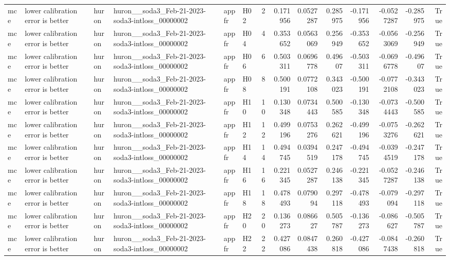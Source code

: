 \begin{longtable}{llllllrrrrrrrr}
mce & lower calibration error is better & huron & huron\_\_soda3\_Feb-21-2023-soda3-intloss\_00000002 & appfr & H02 & 2 & 0.171956 & 0.0527287 & 0.285975 & -0.171956 & -0.0527287 & -0.285975 & True \\
mce & lower calibration error is better & huron & huron\_\_soda3\_Feb-21-2023-soda3-intloss\_00000002 & appfr & H04 & 4 & 0.353652 & 0.0563069 & 0.256949 & -0.353652 & -0.0563069 & -0.256949 & True \\
mce & lower calibration error is better & huron & huron\_\_soda3\_Feb-21-2023-soda3-intloss\_00000002 & appfr & H06 & 6 & 0.503311 & 0.0696778 & 0.49607 & -0.503311 & -0.0696778 & -0.49607 & True \\
mce & lower calibration error is better & huron & huron\_\_soda3\_Feb-21-2023-soda3-intloss\_00000002 & appfr & H08 & 8 & 0.500191 & 0.0772108 & 0.343023 & -0.500191 & -0.0772108 & -0.343023 & True \\
mce & lower calibration error is better & huron & huron\_\_soda3\_Feb-21-2023-soda3-intloss\_00000002 & appfr & H10 & 10 & 0.130348 & 0.0734443 & 0.500585 & -0.130348 & -0.0734443 & -0.500585 & True \\
mce & lower calibration error is better & huron & huron\_\_soda3\_Feb-21-2023-soda3-intloss\_00000002 & appfr & H12 & 12 & 0.499196 & 0.0753276 & 0.262621 & -0.499196 & -0.0753276 & -0.262621 & True \\
mce & lower calibration error is better & huron & huron\_\_soda3\_Feb-21-2023-soda3-intloss\_00000002 & appfr & H14 & 14 & 0.494745 & 0.0394519 & 0.247178 & -0.494745 & -0.0394519 & -0.247178 & True \\
mce & lower calibration error is better & huron & huron\_\_soda3\_Feb-21-2023-soda3-intloss\_00000002 & appfr & H16 & 16 & 0.221345 & 0.0527287 & 0.246138 & -0.221345 & -0.0527287 & -0.246138 & True \\
mce & lower calibration error is better & huron & huron\_\_soda3\_Feb-21-2023-soda3-intloss\_00000002 & appfr & H18 & 18 & 0.478493 & 0.079094 & 0.297118 & -0.478493 & -0.079094 & -0.297118 & True \\
mce & lower calibration error is better & huron & huron\_\_soda3\_Feb-21-2023-soda3-intloss\_00000002 & appfr & H20 & 20 & 0.136273 & 0.086627 & 0.505787 & -0.136273 & -0.086627 & -0.505787 & True \\
mce & lower calibration error is better & huron & huron\_\_soda3\_Feb-21-2023-soda3-intloss\_00000002 & appfr & H22 & 22 & 0.427086 & 0.0847438 & 0.260818 & -0.427086 & -0.0847438 & -0.260818 & True \\

\end{longtable}
